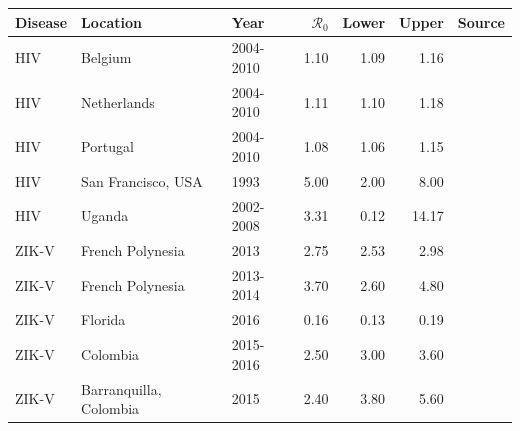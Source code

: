 \documentclass[12pt]{article}
\newcommand{\rr}{\ensuremath{\mathcal{R}_0}}
\begin{document}
\begin{landscape}
\begin{table}[H]
\centering
\begin{tabular}{@{}lllrrrl@{}}
\toprule
\textbf{Disease}    & \textbf{Location}                & \textbf{Year}                 & \textbf{$\rr$} & \textbf{Lower} & \textbf{Upper} & \textbf{Source}                                                                                                                  \\ \midrule
HIV                 & Belgium                          & 2004-2010                     & 1.10          & 1.09           & 1.16           & \cite{coelho2011}   \\
HIV                 & Netherlands                      & 2004-2010                     & 1.11        & 1.10            & 1.18           & \cite{coelho2011}    \\
HIV                 & Portugal                         & 2004-2010                     & 1.08        & 1.06           & 1.15           & \cite{coelho2011}   \\
HIV                 & San Francisco, USA               & 1993                          & 5.00           & 2.00              & 8.00              & \cite{blower1994}    \\
HIV                 & Uganda                           & 2002-2008                     & 3.31        & 0.12           & 14.17          & \cite{nsubuga2014}    \\ \hline
ZIK-V                & French Polynesia                 & 2013                          & 2.75        & 2.53           & 2.98           & \cite{zhang2017}        \\
ZIK-V                & French Polynesia                 & 2013-2014                     & 3.70         & 2.60            & 4.80            & \cite{kucharski2016}  \\
ZIK-V                & Florida                          & 2016                          & 0.16        & 0.13           & 0.19           & \cite{dinh2016}       \\
ZIK-V                & Colombia                         & 2015-2016                     & 2.50         & 3.00              & 3.60            & \cite{nishiura2016}    \\
ZIK-V                & Barranquilla, Colombia           & 2015                          & 2.40         & 3.80            & 5.60            & \cite{towers2016}    \\

\end{tabular}
\end{table}
\end{landscape}
\end{document}
